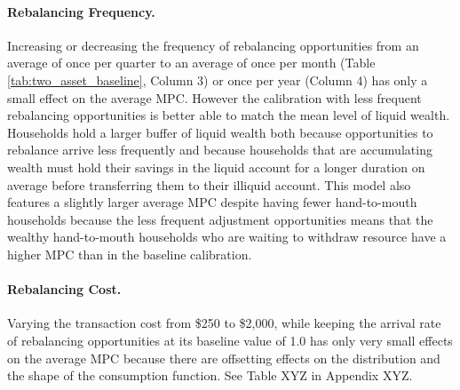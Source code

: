 \paragraph{Rebalancing Frequency.}
Increasing or decreasing the frequency of rebalancing opportunities from an average of once per quarter to an average of once per month (Table \ref{tab:two_asset_baseline}, Column 3) or once per year (Column 4) has only a small effect on the average MPC. However the calibration with less frequent rebalancing opportunities is better able to match the mean level of liquid wealth. Households hold a larger buffer of liquid wealth both because opportunities to rebalance arrive less frequently and because households that are accumulating wealth must hold their savings in the liquid account for a longer duration on average before transferring them to their illiquid account. This model also features a slightly larger average MPC despite having fewer hand-to-mouth households because the  less frequent adjustment opportunities means that the wealthy hand-to-mouth households who are waiting to withdraw resource have a higher MPC than in the baseline calibration.

\paragraph{Rebalancing Cost.}
Varying the transaction cost from \$250 to \$2,000, while keeping the arrival rate of rebalancing opportunities at its baseline value of 1.0 has only very small effects on the average MPC because there are offsetting effects on the distribution and the shape of the consumption function. See Table XYZ in Appendix XYZ.


